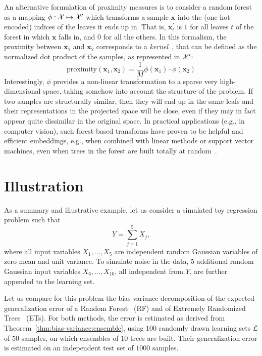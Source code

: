 An alternative formulation of proximity measures is to consider a random forest
as a mapping $\phi: {\cal X} \mapsto {\cal X}^\prime$ which transforms a sample
$\mathbf{x}$ into the (one-hot-encoded) indices of the leaves it ends up in.
That is, $\mathbf{x}^\prime_t$ is $1$ for all leaves $t$ of the forest in which
$\mathbf{x}$ falls in, and $0$ for all the others. In this formalism, the
proximity between $\mathbf{x}_1$ and $\mathbf{x}_2$ corresponds to a
\textit{kernel}~\citep{scholkopf:2001}, that can be defined as the normalized
dot product of the samples, as represented in ${\cal X}^\prime$:
\begin{equation}
\text{proximity}(\mathbf{x}_1, \mathbf{x}_2) = \frac{1}{M} \phi(\mathbf{x}_1) \cdot \phi(\mathbf{x}_2)
\end{equation}
Interestingly, $\phi$ provides a non-linear transformation to a sparse very
high-dimensional space, taking somehow into account the structure of the
problem. If two samples are structurally similar, then they will end up in the
same leafs and their representations in the projected space will be close, even
if they may in fact appear quite dissimilar in the original space.  In practical
applications (e.g., in computer vision), such forest-based transforms have
proven to be helpful and efficient embeddings, e.g., when combined with linear
methods or support vector machines, even when trees in the forest are built
totally at random~\citep{moosmann:2006,maree:2013}.



\section{Illustration}
\label{sec:4:illustration}

As a summary and illustrative example, let us consider a simulated toy
regression problem such that
\begin{equation}
Y = \sum_{j=1}^{5} X_j,
\end{equation}
where all input variables $X_1,\dots,X_{5}$ are independent
random Gaussian variables of zero mean and unit variance. To simulate
noise in the data, 5 additional random Gaussian input variables $X_{6},\dots,X_{10}$,
all independent from $Y$, are further appended to the learning set.

Let us compare for this problem the bias-variance decomposition of the expected
generalization error of a Random Forest~\citep{breiman:2001} (RF) and of
Extremely Randomized Trees~\citep{geurts:2006} (ETs). For both methods, the
error is estimated as derived from Theorem~\ref{thm:bias-variance:ensemble},
using $100$ randomly drawn learning sets ${\cal L}$ of $50$ samples, on which
ensembles of $10$ trees are built. Their generalization error is estimated on
an independent test set of $1000$ samples.

